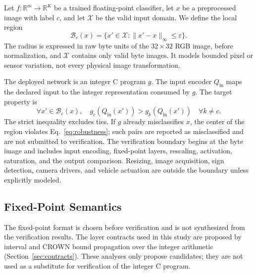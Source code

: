 Let $f:\mathbb{R}^{m}\rightarrow\mathbb{R}^{K}$ be a trained floating-point classifier, let $x$ be a preprocessed image with label $c$, and let $\mathcal{X}$ be the valid input domain. We define the local region
\begin{equation}
\mathcal{B}_{\varepsilon}(x)=\{x'\in\mathcal{X}:\|x'-x\|_{\infty}\leq\varepsilon\}.
\label{eq:ball}
\end{equation}
The radius is expressed in raw byte units of the $32\times32$ RGB image, before normalization, and $\mathcal{X}$ contains only valid byte images. It models bounded pixel or sensor variation, not every physical image transformation.

The deployed network is an integer C program $g$. The input encoder $Q_{\mathrm{in}}$ maps the declared input to the integer representation consumed by $g$. The target property is
\begin{equation}
\forall x'\in\mathcal{B}_{\varepsilon}(x),\quad g_c(Q_{\mathrm{in}}(x'))>g_k(Q_{\mathrm{in}}(x'))\quad\forall k\neq c.
\label{eq:robustness}
\end{equation}
The strict inequality excludes ties. If $g$ already misclassifies $x$, the center of the region violates Eq.~\eqref{eq:robustness}; such pairs are reported as misclassified and are not submitted to verification. The verification boundary begins at the byte image and includes input encoding, fixed-point layers, rescaling, activation, saturation, and the output comparison. Resizing, image acquisition, sign detection, camera drivers, and vehicle actuation are outside the boundary unless explicitly modeled.

\subsection{Fixed-Point Semantics}
\label{sec:synthesis}

The fixed-point format is chosen before verification and is not synthesized from the verification results. The layer contracts used in this study are proposed by interval and CROWN bound propagation over the integer arithmetic (Section~\ref{sec:contracts}). These analyses only propose candidates; they are not used as a substitute for verification of the integer C program.

